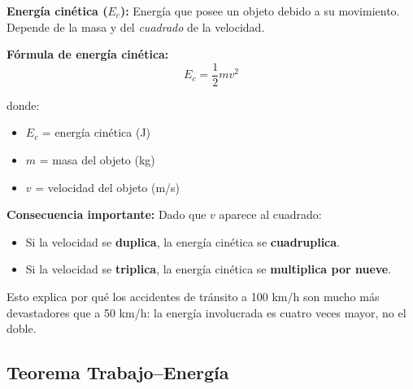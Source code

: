 \begin{seccion}
\begin{definicion}
    \textbf{Energía cinética ($E_c$):} Energía que posee un objeto debido a su movimiento. Depende de la masa y del \textit{cuadrado} de la velocidad.
\end{definicion}

\begin{ecuacion}
\textbf{Fórmula de energía cinética:}
$$E_c = \frac{1}{2}mv^2$$

donde:
\begin{itemize}
    \item $E_c$ = energía cinética (J)
    \item $m$ = masa del objeto (kg)
    \item $v$ = velocidad del objeto (m/s)
\end{itemize}
\end{ecuacion}

\textbf{Consecuencia importante:} Dado que $v$ aparece al cuadrado:
\begin{itemize}
    \item Si la velocidad se \textbf{duplica}, la energía cinética se \textbf{cuadruplica}.
    \item Si la velocidad se \textbf{triplica}, la energía cinética se \textbf{multiplica por nueve}.
\end{itemize}

Esto explica por qué los accidentes de tránsito a 100 km/h son mucho más devastadores que a 50 km/h: la energía involucrada es cuatro veces mayor, no el doble.
\end{seccion}

\subsection{Teorema Trabajo--Energía}


